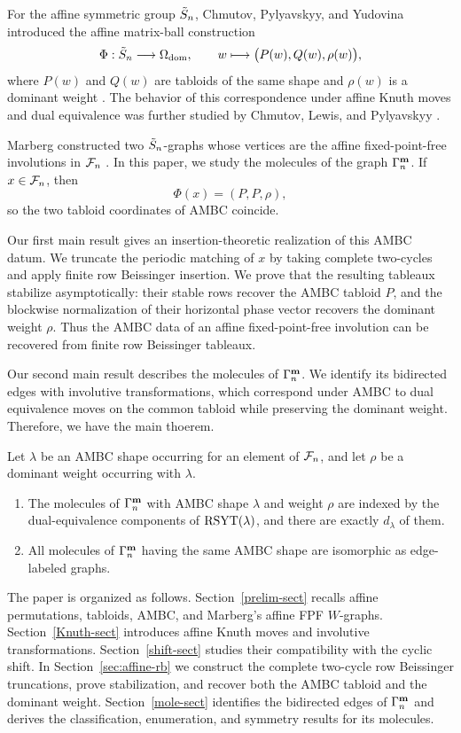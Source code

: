\documentclass[11pt]{article}
\begin{document}
For the affine symmetric group $\tilde S_n$, Chmutov,
Pylyavskyy, and Yudovina introduced the affine matrix-ball
construction
\[
\Phi:\tilde S_n\longrightarrow\Omega_{\mathrm{dom}},
\qquad
w\longmapsto\bigl(P(w),Q(w),\rho(w)\bigr),
\]
where $P(w)$ and $Q(w)$ are tabloids of the same shape and
$\rho(w)$ is a dominant weight \cite{CPY}.  The behavior of
this correspondence under affine Knuth moves and dual
equivalence was further studied by Chmutov, Lewis, and
Pylyavskyy \cite{CLP}.

Marberg constructed two $\tilde S_n$-graphs whose vertices are the
affine fixed-point-free involutions in $\mathcal F_n$ \cite{Marberg}.
In this paper, we study the molecules of the graph
$\Gamma_n^{\mathbf{m}}$.  If $x\in\mathcal F_n$, then
\[
\Phi(x)=(P,P,\rho),
\]
so the two tabloid coordinates of AMBC coincide.

Our first main result gives an insertion-theoretic realization
of this AMBC datum.  We truncate the periodic matching of
$x$ by taking complete two-cycles and apply finite row
Beissinger insertion.  We prove that the resulting tableaux
stabilize asymptotically: their stable rows recover the AMBC
tabloid $P$, and the blockwise normalization of their
horizontal phase vector recovers the dominant weight $\rho$.
Thus the AMBC data of an affine fixed-point-free involution can
be recovered from finite row Beissinger tableaux.

Our second main result describes the molecules of
$\Gamma_n^{\mathbf{m}}$.  We identify its bidirected edges with
involutive transformations, which correspond under AMBC to
dual equivalence moves on the common tabloid while preserving
the dominant weight. Therefore, we have the main thoerem.
\begin{theorem}
\label{intro-molecule-thm}
Let $\lambda$ be an AMBC shape occurring for an element of $\mathcal F_n$, and
let $\rho$ be a dominant weight occurring with $\lambda$.
\begin{enumerate}
\item The molecules of $\Gamma_n^{\mathbf{m}}$ with AMBC shape $\lambda$ and
      weight $\rho$ are indexed by the dual-equivalence components of
      $\textup{RSYT}(\lambda)$, and there are exactly $d_\lambda$ of them.
\item All molecules of $\Gamma_n^{\mathbf{m}}$ having the same AMBC shape are
      isomorphic as edge-labeled graphs.
\end{enumerate}
\end{theorem}

The paper is organized as follows.  Section~\ref{prelim-sect} recalls affine
permutations, tabloids, AMBC, and Marberg's affine FPF $W$-graphs.
Section~\ref{Knuth-sect} introduces affine Knuth moves and involutive transformations.
Section~\ref{shift-sect} studies their compatibility with the cyclic shift.  In
Section~\ref{sec:affine-rb} we construct the complete two-cycle row Beissinger
truncations, prove stabilization, and recover both the AMBC tabloid and
the dominant weight.  Section~\ref{mole-sect} identifies the bidirected edges of
$\Gamma_n^{\mathbf{m}}$ and derives the classification, enumeration, and
symmetry results for its molecules.
\end{document}
